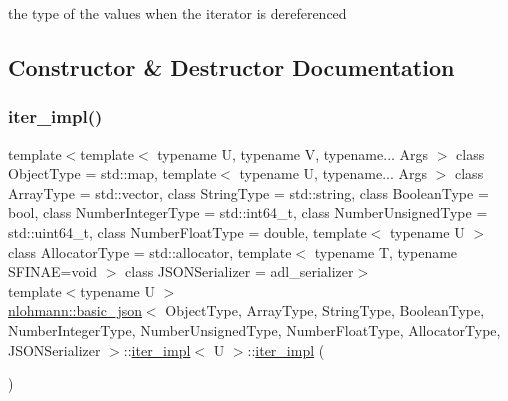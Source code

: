 the type of the values when the iterator is dereferenced 



\subsection{Constructor \& Destructor Documentation}
\mbox{\label{classnlohmann_1_1basic__json_1_1iter__impl_a3e45be67e4384b3eacb72bd6147a6a91}} 
\subsubsection{\texorpdfstring{iter\_impl()}{iter\_impl()}\hspace{0.1cm}{\footnotesize\ttfamily [1/3]}}
{\footnotesize\ttfamily template$<$template$<$ typename U, typename V, typename... Args $>$ class Object\+Type = std\+::map, template$<$ typename U, typename... Args $>$ class Array\+Type = std\+::vector, class String\+Type  = std\+::string, class Boolean\+Type  = bool, class Number\+Integer\+Type  = std\+::int64\+\_\+t, class Number\+Unsigned\+Type  = std\+::uint64\+\_\+t, class Number\+Float\+Type  = double, template$<$ typename U $>$ class Allocator\+Type = std\+::allocator, template$<$ typename T, typename S\+F\+I\+N\+A\+E=void $>$ class J\+S\+O\+N\+Serializer = adl\+\_\+serializer$>$ \\
template$<$typename U $>$ \\
\mbox{\hyperlink{classnlohmann_1_1basic__json}{nlohmann\+::basic\+\_\+json}}$<$ Object\+Type, Array\+Type, String\+Type, Boolean\+Type, Number\+Integer\+Type, Number\+Unsigned\+Type, Number\+Float\+Type, Allocator\+Type, J\+S\+O\+N\+Serializer $>$\+::\mbox{\hyperlink{classnlohmann_1_1basic__json_1_1iter__impl}{iter\+\_\+impl}}$<$ U $>$\+::\mbox{\hyperlink{classnlohmann_1_1basic__json_1_1iter__impl}{iter\+\_\+impl}} (\begin{DoxyParamCaption}{ }\end{DoxyParamCaption})\hspace{0.3cm}{\ttfamily [default]}}



